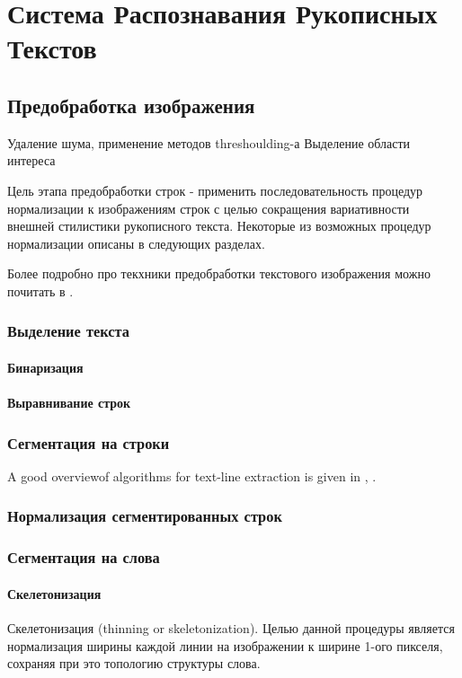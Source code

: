 \chapter{Система Распознавания Рукописных Текстов}

\section{Предобработка изображения}

Удаление шума, применение методов threshoulding-а
Выделение области интереса

Цель этапа предобработки строк - применить последовательность процедур нормализации к изображениям строк с целью сокращения вариативности внешней стилистики рукописного текста. Некоторые из возможных процедур нормализации описаны в следующих разделах.

Более подробно про текхники предобработки текстового изображения можно почитать в \cite{fujisawa2007robustness, durebrandt2015segmentation}.

\subsection{Выделение текста}
\subsubsection{Бинаризация}
\subsubsection{Выравнивание строк}
\subsection{Сегментация на строки}

A good overviewof algorithms for text-line extraction is given in \cite{likforman2007text}, \cite{durebrandt2015segmentation}.

\subsection{Нормализация сегментированных строк}
\subsection{Сегментация на слова}
\subsubsection{Скелетонизация}
Скелетонизация (thinning or skeletonization). Целью данной процедуры является нормализация ширины каждой линии на изображении к ширине 1-ого пикселя, сохраняя при это топологию структуры слова. \cite{suen1994thinning}

